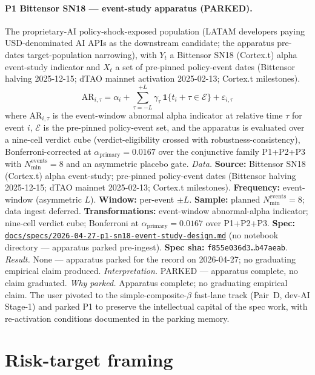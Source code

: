 \paragraph{P1 Bittensor SN18 --- event-study apparatus (PARKED).}
The proprietary-AI policy-shock-exposed population (LATAM developers paying USD-denominated AI APIs as the downstream candidate; the apparatus pre-dates target-population narrowing), with \(Y_t\) a Bittensor SN18 (Cortex.t) alpha event-study indicator and \(X_t\) a set of pre-pinned policy-event dates (Bittensor halving 2025-12-15; dTAO mainnet activation 2025-02-13; Cortex.t milestones).
\[ \mathrm{AR}_{i, \tau} = \alpha_i + \sum_{\tau = -L}^{+L} \gamma_\tau\, \mathbf{1}\{t_i + \tau \in \mathcal{E}\} + \varepsilon_{i, \tau} \]
where \(\mathrm{AR}_{i, \tau}\) is the event-window abnormal alpha indicator at relative time \(\tau\) for event \(i\), \(\mathcal{E}\) is the pre-pinned policy-event set, and the apparatus is evaluated over a nine-cell verdict cube (verdict-eligibility crossed with robustness-consistency), Bonferroni-corrected at \(\alpha_{\mathrm{primary}} = 0.0167\) over the conjunctive family P1+P2+P3 with \(N_{\min}^{\mathrm{events}} = 8\) and an asymmetric placebo gate.
\textit{Data.} \textbf{Source:} Bittensor SN18 (Cortex.t) alpha event-study; pre-pinned policy-event dates (Bittensor halving 2025-12-15; dTAO mainnet 2025-02-13; Cortex.t milestones). \textbf{Frequency:} event-window (asymmetric \(L\)). \textbf{Window:} per-event \(\pm L\). \textbf{Sample:} planned \(N_{\min}^{\mathrm{events}} = 8\); data ingest deferred. \textbf{Transformations:} event-window abnormal-alpha indicator; nine-cell verdict cube; Bonferroni at \(\alpha_{\mathrm{primary}} = 0.0167\) over P1+P2+P3. \textbf{Spec:} \href{https://github.com/JMSBPP/abrigo-analytics/blob/master/docs/specs/2026-04-27-p1-sn18-event-study-design.md}{\texttt{docs/specs/2026-04-27-p1-sn18-event-study-design.md}} (no notebook directory --- apparatus parked pre-ingest). \textbf{Spec sha:} \texttt{f855e036d3\ldots b47aeab}.
\textit{Result.} None --- apparatus parked for the record on 2026-04-27; no graduating empirical claim produced.
\textit{Interpretation.} PARKED --- apparatus complete, no claim graduated.
\textit{Why parked.} Apparatus complete; no graduating empirical claim. The user pivoted to the simple-composite-\(\beta\) fast-lane track (Pair~D, dev-AI Stage-1) and parked P1 to preserve the intellectual capital of the spec work, with re-activation conditions documented in the parking memory.

\section{Risk-target framing}\label{sec:3}

